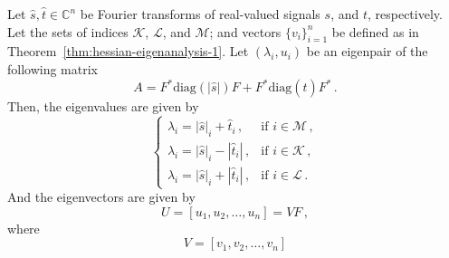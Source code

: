 \begin{thm}
  \label{thm:hessian-eigenanalysis}
  Let  $\hat{s}, \hat{t}\in\mathbb C^{n}$ be Fourier
  transforms of real-valued signals $s$, and $t$, respectively.
  Let the sets of indices $\mathcal K$, $\mathcal L$, and $\mathcal
  M$; and vectors $\{v_{i}\}_{i=1}^{n}$
  be defined as in Theorem~\ref{thm:hessian-eigenanalysis-1}. Let
  $(\lambda_{i}, u_{i})$ be an eigenpair of the following matrix
  \begin{equation}
    \label{eq:93}
    A = F^{*}\mathrm{diag}(|\hat{s}|)F + F^{*}
    \mathrm{diag}(\hat{t})F^{*} \,.
  \end{equation}
  Then, the eigenvalues are given by
  \begin{equation}
    \label{eq:106}
    \begin{cases}
      \lambda_{i} = |\hat{s}|_{i} + \hat{t}_{i} \,,  & \text{if } i\in \mathcal{M} \,, \\
      \lambda_{i} = |\hat{s}|_{i} -|\hat{t}_{i}| \,, & \text{if } i\in \mathcal{K} \,, \\
      \lambda_{i} = |\hat{s}|_{i} + |\hat{t}_{i}| \,,  & \text{if } i\in \mathcal{L} \,.
    \end{cases}
  \end{equation}
  And the eigenvectors are given by
  \begin{equation}
    \label{eq:107}
    U = [u_{1}, u_{2},\ldots, u_{n}] = VF \,, 
  \end{equation}
  where
  \begin{equation}
    \label{eq:108}
    V = [v_{1}, v_{2}, \ldots, v_{n}]
  \end{equation}
\end{thm}

